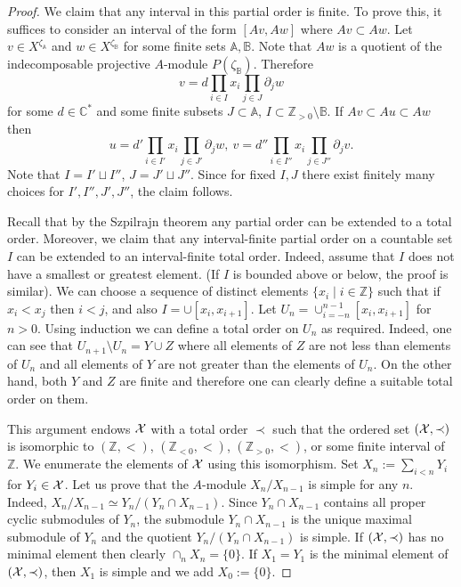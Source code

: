 \documentclass[12pt]{amsart}
\makeatletter
\def\mathcal{\cal}
\def\@putname#1#2#3#4{\def\@@ref{#3}\let\old@bf\bf
        \def\bf##1{\old@bf\if?\noexpand##1?{#4}\else##1\fi}%
	#1{#2}%
        \let\bf\old@bf}
\def\@putname#1#2#3#4{\def\@@ref{#3}\let\old@bf\bf	%
	\let\old@reset@font\reset@font			%
        \def\bf##1{\old@bf\if?\noexpand##1?{#4}\else##1\fi}%
	\def\reset@font##1##2{\old@reset@font##1\if?\noexpand##2?{#4}\else##2\fi}#1{#2}%
        \let\bf\old@bf\let\reset@font\old@reset@font}
\let\my@cite=\cite
\def\cite#1{\@putname\my@cite{#1}{\@citeb}{\tiny\rm\@@ref}}
\theoremstyle{plain} %
\numberwithin{equation}{section}
\theoremstyle{definition}
\theoremstyle{remark}
\theoremstyle{plain} %
\makeatother
\begin{document}
\begin{proof}
        We claim that any interval in this partial order is finite.
        To prove this, it suffices to consider an interval of the form $[Av,Aw]$ where $Av\subset Aw$. Let $v\in X^{\zeta_{\mathbb A}}$ and $w\in X^{\zeta_{\mathbb B}}$ for some finite sets ${\mathbb A},{\mathbb B}$. Note that $Aw$ is a quotient of the indecomposable projective $A$-module $P(\zeta_{\mathbb B})$. Therefore $$v=d\prod_{i\in I}x_i\prod_{j\in J}\partial_jw$$ for some $d\in \mathbb C^*$ and some finite subsets
        $J\subset \mathbb A$, $I\subset \mathbb Z_{>0}\setminus \mathbb B$. If $Av\subset Au\subset Aw$ then
        $$u=d'\prod_{i\in I'}x_i\prod_{j\in J'}\partial_jw,\ v=d''\prod_{i\in I''}x_i\prod_{j\in J''}\partial_jv.$$
        Note that  $I=I'\sqcup I''$, $J=J'\sqcup J''$. Since for fixed $I,J$ there exist finitely many choices
        for $I',I'',J',J''$, the claim follows.       
          
          
Recall that by the Szpilrajn theorem \cite{Mar} any partial order can be extended to a total order.            
Moreover, we claim that any interval-finite partial order on a countable set $I$ can be extended to an  interval-finite total order.  Indeed, assume that $I$ does not have a smallest or greatest element.
(If $I$ is bounded above or below, the proof is similar). We can choose a sequence of distinct elements $\{x_i\mid i\in\mathbb Z\}$ such that if
                    $x_i<x_j$ then $i<j$, and also $I=\cup [x_i,x_{i+1}]$. Let $U_n=\cup_{i=-n}^{n-1}[x_i,x_{i+1}]$ for $n>0$. Using induction we can define a total order on $U_n$ as required. Indeed, one can see that
                    $U_{n+1}\setminus U_{n}=Y\cup Z$ where all elements of $Z$ are not less than elements of $U_n$ and all elements of $Y$ are not greater than the elements of $U_n$. On the other hand, both  $Y$ and $Z$ are finite and therefore
                    one can clearly define a suitable total order on them.
             
                    This argument endows $\mathcal X$ with a total order $\prec$ such that the ordered set $(\mathcal X,\prec)$ is isomorphic to $(\mathbb Z, <)$, $(\mathbb Z_{<0}, <)$, $(\mathbb Z_{>0}, <)$, or some finite interval of $\mathbb Z$.  We enumerate the elements of $\mathcal X$ using this isomorphism.
                 Set                  $X_n:=\sum_{i<n} Y_i$ for $Y_i \in \mathcal X$.
                 Let us prove that the $A$-module $X_n/X_{n-1}$ is simple for any $n$. Indeed, $X_n/X_{n-1}\simeq Y_n/(Y_n\cap X_{n-1})$. Since $Y_n\cap X_{n-1}$ contains all
                 proper cyclic submodules of $Y_n$, the submodule $Y_n\cap X_{n-1}$ is the unique maximal submodule of
                 $Y_n$ and the quotient $Y_n/(Y_n\cap X_{n-1})$
                 is simple. If $(\mathcal X,\prec)$ has no minimal element then clearly $\cap_n X_n=\{0\}$. If $X_1=Y_1$ is the minimal element of
                 $(\mathcal X,\prec)$, then $X_1$ is simple and we add $X_0:=\{0\}$.
               \end{proof}
\end{document}
